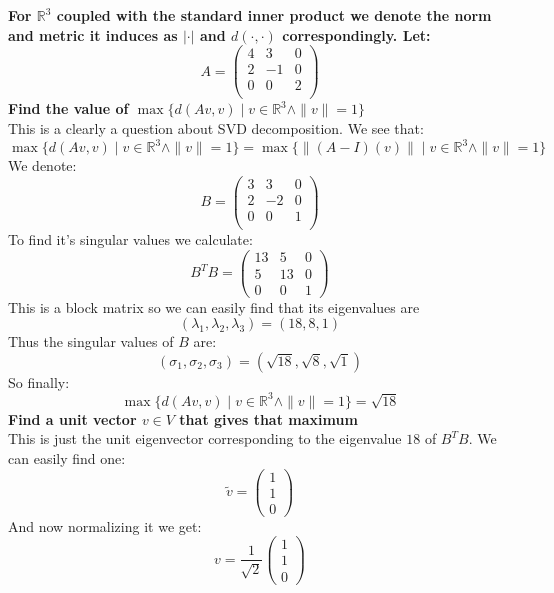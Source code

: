 \documentclass[11pt,a4paper]{article}
\theoremstyle{plain}
\newcommand{\R}{\mathbb{R}}
\begin{document}
	\newpage
	\noindent
	\textbf{For $\R^3$ coupled with the standard inner product we denote the
	norm and metric it induces as $|\cdot|$ and $d(\cdot,\cdot)$ 
	correspondingly. Let:
	\[
	A = \begin{pmatrix}
			4 & 3 & 0\\
			2 & -1 & 0\\
			0 & 0 & 2\\
		\end{pmatrix}
	\]
	Find the value of $\max\{d(Av,v) \mid v\in\R^3 \land \|v\| = 1\}$} \\
	This is a clearly a question about SVD decomposition. We see that:
	\[
		\max\{d(Av,v) \mid v\in\R^3 \land \|v\| = 1\} =
		\max\{\|(A-I)(v)\| \mid v\in\R^3 \land \|v\| = 1\}
	\]
	We denote:
	\[
		B = \begin{pmatrix}
			3 & 3 & 0\\
			2 & -2 & 0\\
			0 & 0 & 1\\
		\end{pmatrix}
	\]
	To find it's singular values we calculate:
	\[
		B^TB = 
		\left(\begin{matrix}
			13 & 5 & 0 \\
			5 & 13 & 0 \\
			0 & 0 & 1
		\end{matrix}\right)
	\]
	This is a block matrix so we can easily find that its eigenvalues are
	\[
		(\lambda_1, \lambda_2, \lambda_3) = (18,8,1)
	\]
	Thus the singular values of $B$ are:
	\[
		(\sigma_1, \sigma_2, \sigma_3) = (\sqrt{18},\sqrt{8},\sqrt{1})
	\]
	So finally:
	\[
		\max\{d(Av,v) \mid v\in\R^3 \land \|v\| = 1\} = \sqrt{18}
	\]
	\textbf{Find a unit vector $v\in V$ that gives that maximum} \\ 
	This is just the unit eigenvector corresponding to the eigenvalue $18$ of
	$B^TB$. We can easily find one:
	\[
		\tilde{v} = \begin{pmatrix} 1 \\ 1 \\ 0 \end{pmatrix}
	\]
	And now normalizing it we get:
	\[
		v = \frac{1}{\sqrt{2}}\begin{pmatrix} 1 \\ 1 \\ 0 \end{pmatrix}
	\]
	
\end{document}
